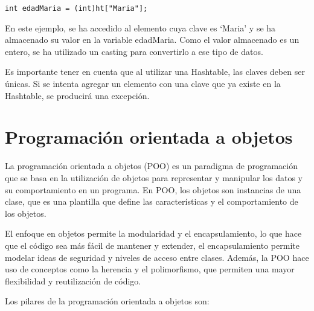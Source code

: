 \documentclass[executivepaper]{article}
\begin{document}
\begin{lstlisting}
int edadMaria = (int)ht["Maria"];
\end{lstlisting}

En este ejemplo, se ha accedido al elemento cuya clave es \enquote*{Maria} y se ha almacenado su valor en la variable edadMaria. Como el valor almacenado es un entero, se ha utilizado un casting para convertirlo a ese tipo de datos.

Es importante tener en cuenta que al utilizar una Hashtable, las claves deben ser únicas. Si se intenta agregar un elemento con una clave que ya existe en la Hashtable, se producirá una excepción.

\section{Programación orientada a objetos}

La programación orientada a objetos (POO) es un paradigma de programación que se basa en la utilización de objetos para representar y manipular los datos y su comportamiento en un programa. En POO, los objetos son instancias de una clase, que es una plantilla que define las características y el comportamiento de los objetos.

El enfoque en objetos permite la modularidad y el encapsulamiento, lo que hace que el código sea más fácil de mantener y extender, el encapsulamiento permite modelar ideas de seguridad y niveles de acceso entre clases. Además, la POO hace uso de conceptos como la herencia y el polimorfismo, que permiten una mayor flexibilidad y reutilización de código.

Los pilares de la programación orientada a objetos son:
\end{document}

